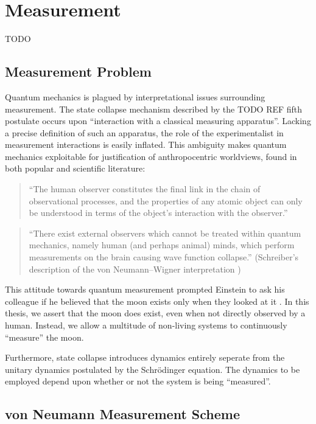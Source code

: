 \chapter{Measurement}

TODO

\section{Measurement Problem}
Quantum mechanics is plagued by interpretational issues surrounding measurement. The state collapse mechanism described by the TODO REF fifth postulate occurs upon ``interaction with a classical measuring apparatus''. Lacking a precise definition of such an apparatus, the role of the experimentalist in measurement interactions is easily inflated. This ambiguity makes quantum mechanics exploitable for justification of anthropocentric worldviews, found in both popular and scientific literature:

\begin{quote}
``The human observer constitutes the final link in the chain of observational processes, and the properties of any atomic object can only be understood in terms of the object's interaction with the observer.'' \cite{Capra}
\end{quote}

\begin{quote}
``There exist external observers which cannot be treated within quantum mechanics, namely human (and perhaps animal) minds, which perform measurements on the brain causing wave function collapse.'' (Schreiber's description of the von Neumann–Wigner interpretation \cite{Schreiber})
\end{quote}

This attitude towards quantum measurement prompted Einstein to ask his colleague if he believed that the moon exists only when they looked at it \cite{Pais}. In this thesis, we assert that the moon does exist, even when not directly observed by a human. Instead, we allow a multitude of non-living systems to continuously ``measure'' the moon.

Furthermore, state collapse introduces dynamics entirely seperate from the unitary dynamics postulated by the Schrödinger equation. The dynamics to be employed depend upon whether or not the system is being ``measured''.

\section{von Neumann Measurement Scheme}

